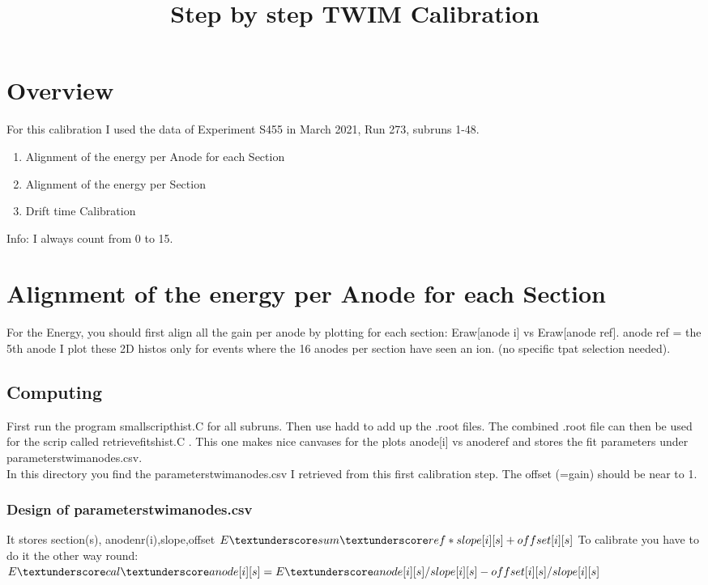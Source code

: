 \documentclass{report}
\title{Step by step TWIM Calibration}
\begin{document}
\maketitle

\section{Overview}
For this calibration I used the data of Experiment S455 in March 2021, Run 273, subruns 1-48.
\begin{enumerate}
	\item Alignment of the energy per Anode for each Section
	\item Alignment of the energy per Section
	\item Drift time Calibration
\end{enumerate}
Info: I always count from 0 to 15.

\section{Alignment of the energy per Anode for each Section}
For the Energy, you should first align all the gain per anode by plotting for each section:\newline 
Eraw[anode i] vs Eraw[anode ref].\newline
anode ref = the 5th anode\newline
I plot these 2D histos only for events where the 16 anodes per section have seen an ion. (no specific tpat selection needed).
\subsection{Computing}
First run the program \dq small\textunderscore script\textunderscore hist.C\dq{} for all subruns. Then use \dq hadd\dq{} to add up the .root
files. The combined .root file can then be used for the scrip called \dq retrieve\textunderscore fits\textunderscore hist.C \dq{}. This one makes nice canvases for the plots anode[i] vs anode\textunderscore ref and stores the fit parameters under 
parameters\textunderscore twim\textunderscore anodes.csv.\\
In this directory you find the parameters\textunderscore twim\textunderscore anodes.csv I retrieved from this first calibration step. The offset (=gain) should be near to 1.\newline
\subsubsection{Design of parameters\textunderscore twim\textunderscore anodes.csv}
It stores section(s), anodenr(i),slope,offset\newline
$E\textunderscore sum\textunderscore ref*slope[i][s] + offset[i][s]$\newline
To calibrate you have to do it the other way round:\newline
$E\textunderscore cal\textunderscore anode[i][s] = E\textunderscore anode[i][s]/slope[i][s] -offset[i][s]/slope[i][s]$
\end{document}
